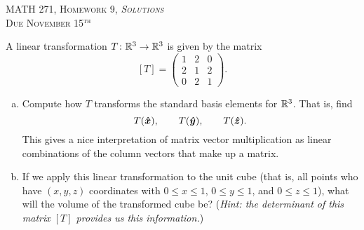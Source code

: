 \documentclass[12pt]{article} %
\begin{document}
\begin{center}
   \textsc{\large MATH 271, Homework 9, \emph{Solutions}}\\
   \textsc{Due November 15$^\textrm{th}$}
\end{center}
\vspace{.5cm}

\newpage
\begin{problem}
A linear transformation $T\colon \mathbb{R}^3 \to \mathbb{R}^3$ is given by the matrix
\[
[T]= \begin{pmatrix}
1& 2& 0\\
2& 1& 2\\
0& 2& 1
\end{pmatrix}.
\]
\begin{enumerate}[(a)]
    \item Compute how $T$ transforms the standard basis elements for $\mathbb{R}^3$. That is, find
    \[
    T(\boldsymbol{\hat{x}}), \qquad
    T(\boldsymbol{\hat{y}}), \qquad 
    T(\boldsymbol{\hat{z}}).
    \]
    This gives a nice interpretation of matrix vector multiplication as linear combinations of the column vectors that make up a matrix.
    \item If we apply this linear transformation to the unit cube (that is, all points who have $(x,y,z)$ coordinates with $0\leq x \leq 1$, $0\leq y \leq 1$, and $0\leq z \leq 1$), what will the volume of the transformed cube be? (\emph{Hint: the determinant of this matrix $[T]$ provides us this information.})
\end{enumerate}
\end{problem}
\end{document}
